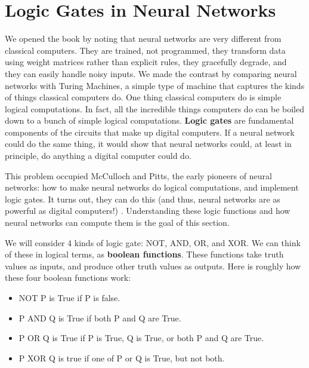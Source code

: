 \chapter{Logic Gates in Neural Networks}\label{ch_logicgates}


We opened the book by noting that neural networks are very different from classical computers. They are trained, not programmed, they transform data using weight matrices rather than explicit rules, they gracefully degrade, and they can easily handle noisy inputs. We made the contrast by comparing neural networks with Turing Machines, a simple type of machine that captures the kinds of things classical computers do. One thing classical computers do is simple logical computations.  In fact, all the incredible things computers do can be boiled down to a bunch of simple logical computations. \textbf{Logic gates} are fundamental components of the circuits that make up digital computers. If a neural network could do the same thing, it would show that neural networks could, at least in principle, do anything a digital computer could do.

This problem occupied McCulloch and Pitts, the early pioneers of neural networks: how to make neural networks do logical computations, and implement logic gates. It turns out, they can do this  (and thus, neural networks are as powerful as digital computers!) \cite{mcculloch1943logical}. Understanding these logic functions and how neural networks can compute them is the goal of this section.

We will consider 4 kinds of logic gate: NOT, AND, OR, and XOR. We can think of these in logical terms, as \textbf{boolean functions}. These functions take truth values as inputs, and produce other truth values as outputs. Here is roughly how these four boolean functions work:

\begin{itemize}
\item NOT P is True if P is false.
\item P AND Q is True if both P and Q are True.
\item P OR Q is True if P is True, Q is True, or both P and Q are True.
\item P XOR Q is true if one of P or Q is True, but not both.
\end{itemize}

